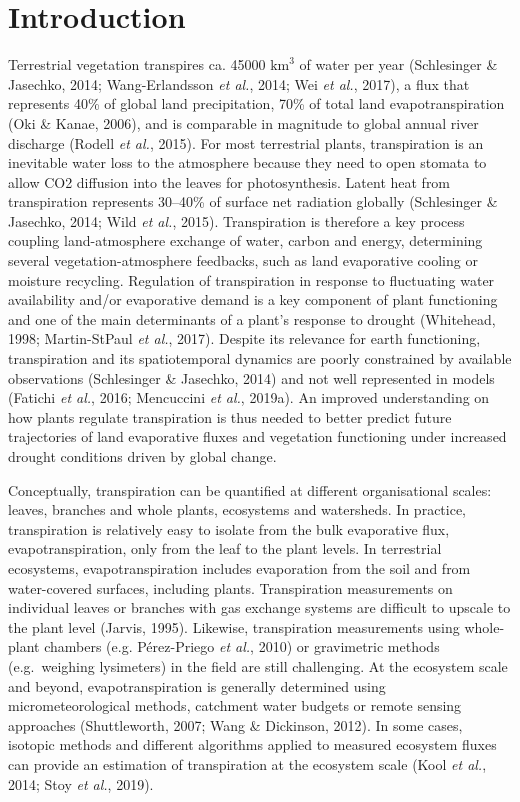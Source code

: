 \documentclass[11pt,twoside]{reedthesis}
\begin{document}
\newpage

\section{Introduction}\label{introduction}

Terrestrial vegetation transpires ca. 45000 \(\text{km}^3\) of water per
year (Schlesinger \& Jasechko, 2014; Wang-Erlandsson \emph{et al.},
2014; Wei \emph{et al.}, 2017), a flux that represents 40\% of global
land precipitation, 70\% of total land evapotranspiration (Oki \& Kanae,
2006), and is comparable in magnitude to global annual river discharge
(Rodell \emph{et al.}, 2015). For most terrestrial plants, transpiration
is an inevitable water loss to the atmosphere because they need to open
stomata to allow CO2 diffusion into the leaves for photosynthesis.
Latent heat from transpiration represents 30--40\% of surface net
radiation globally (Schlesinger \& Jasechko, 2014; Wild \emph{et al.},
2015). Transpiration is therefore a key process coupling land-atmosphere
exchange of water, carbon and energy, determining several
vegetation-atmosphere feedbacks, such as land evaporative cooling or
moisture recycling. Regulation of transpiration in response to
fluctuating water availability and/or evaporative demand is a key
component of plant functioning and one of the main determinants of a
plant's response to drought (Whitehead, 1998; Martin-StPaul \emph{et
al.}, 2017). Despite its relevance for earth functioning, transpiration
and its spatiotemporal dynamics are poorly constrained by available
observations (Schlesinger \& Jasechko, 2014) and not well represented in
models (Fatichi \emph{et al.}, 2016; Mencuccini \emph{et al.}, 2019a).
An improved understanding on how plants regulate transpiration is thus
needed to better predict future trajectories of land evaporative fluxes
and vegetation functioning under increased drought conditions driven by
global change.\par

Conceptually, transpiration can be quantified at different
organisational scales: leaves, branches and whole plants, ecosystems and
watersheds. In practice, transpiration is relatively easy to isolate
from the bulk evaporative flux, evapotranspiration, only from the leaf
to the plant levels. In terrestrial ecosystems, evapotranspiration
includes evaporation from the soil and from water-covered surfaces,
including plants. Transpiration measurements on individual leaves or
branches with gas exchange systems are difficult to upscale to the plant
level (Jarvis, 1995). Likewise, transpiration measurements using
whole-plant chambers (e.g. Pérez-Priego \emph{et al.}, 2010) or
gravimetric methods (e.g.~weighing lysimeters) in the field are still
challenging. At the ecosystem scale and beyond, evapotranspiration is
generally determined using micrometeorological methods, catchment water
budgets or remote sensing approaches (Shuttleworth, 2007; Wang \&
Dickinson, 2012). In some cases, isotopic methods and different
algorithms applied to measured ecosystem fluxes can provide an
estimation of transpiration at the ecosystem scale (Kool \emph{et al.},
2014; Stoy \emph{et al.}, 2019).\par
\end{document}
